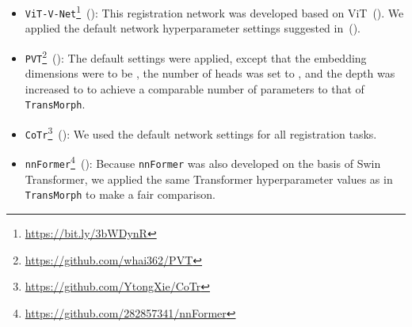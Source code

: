 \documentclass[times,twocolumn,final]{elsarticle}
\begin{document}
\begin{itemize}[noitemsep]
    \item \texttt{ViT-V-Net}\footnote{\url{ https://bit.ly/3bWDynR}}~(\cite{chen2021vit}): This registration network was developed based on ViT~(\cite{dosovitskiy2020image}). We applied the default network hyperparameter settings suggested in~(\cite{chen2021vit}).
    \item \texttt{PVT}\footnote{\url{https://github.com/whai362/PVT}}~(\cite{wang2021pyramid}): The default settings were applied, except that the embedding dimensions were to be , the number of heads was set to , and the depth was increased to  to achieve a comparable number of parameters to that of \texttt{TransMorph}.
    \item \texttt{CoTr}\footnote{\url{https://github.com/YtongXie/CoTr}}~(\cite{xie2021cotr}): We used the default network settings for all registration tasks.
    \item \texttt{nnFormer}\footnote{\url{https://github.com/282857341/nnFormer}}~(\cite{zhou2021nnformer}): Because \texttt{nnFormer} was also developed on the basis of Swin Transformer, we applied the same Transformer hyperparameter values as in \texttt{TransMorph} to make a fair comparison.
\end{itemize}
\end{document}
